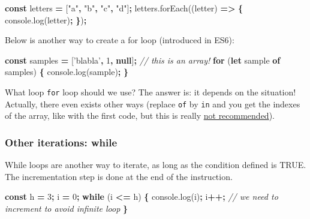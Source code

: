 \documentclass[
]{book}
\newenvironment{Shaded}{\begin{snugshade}}{\end{snugshade}}
\newcommand{\AttributeTok}[1]{\textcolor[rgb]{0.77,0.63,0.00}{#1}}
\newcommand{\CommentTok}[1]{\textcolor[rgb]{0.56,0.35,0.01}{\textit{#1}}}
\newcommand{\ControlFlowTok}[1]{\textcolor[rgb]{0.13,0.29,0.53}{\textbf{#1}}}
\newcommand{\DecValTok}[1]{\textcolor[rgb]{0.00,0.00,0.81}{#1}}
\newcommand{\KeywordTok}[1]{\textcolor[rgb]{0.13,0.29,0.53}{\textbf{#1}}}
\newcommand{\NormalTok}[1]{#1}
\newcommand{\OperatorTok}[1]{\textcolor[rgb]{0.81,0.36,0.00}{\textbf{#1}}}
\newcommand{\StringTok}[1]{\textcolor[rgb]{0.31,0.60,0.02}{#1}}
\newcommand{\VariableTok}[1]{\textcolor[rgb]{0.00,0.00,0.00}{#1}}
\begin{document}
\begin{Shaded}
\begin{Highlighting}[]
\KeywordTok{const}\NormalTok{ letters }\OperatorTok{=}\NormalTok{ [}\StringTok{"a"}\OperatorTok{,} \StringTok{"b"}\OperatorTok{,} \StringTok{"c"}\OperatorTok{,} \StringTok{"d"}\NormalTok{]}\OperatorTok{;}
\VariableTok{letters}\NormalTok{.}\AttributeTok{forEach}\NormalTok{((letter) }\KeywordTok{=>} \OperatorTok{\{}
  \VariableTok{console}\NormalTok{.}\AttributeTok{log}\NormalTok{(letter)}\OperatorTok{;}
\OperatorTok{\}}\NormalTok{)}\OperatorTok{;}
\end{Highlighting}
\end{Shaded}

Below is another way to create a for loop (introduced in ES6):

\begin{Shaded}
\begin{Highlighting}[]
\KeywordTok{const}\NormalTok{ samples }\OperatorTok{=}\NormalTok{ [}\StringTok{'blabla'}\OperatorTok{,} \DecValTok{1}\OperatorTok{,} \KeywordTok{null}\NormalTok{]}\OperatorTok{;} \CommentTok{// this is an array!}
\ControlFlowTok{for}\NormalTok{ (}\KeywordTok{let}\NormalTok{ sample }\KeywordTok{of}\NormalTok{ samples) }\OperatorTok{\{}
 \VariableTok{console}\NormalTok{.}\AttributeTok{log}\NormalTok{(sample)}\OperatorTok{;}
\OperatorTok{\}}
\end{Highlighting}
\end{Shaded}

What loop \texttt{for} loop should we use? The answer is: it depends on the situation! Actually, there even exists other ways (replace \texttt{of} by \texttt{in} and you get the indexes of the array, like with the first code, but this is really \href{https://hacks.mozilla.org/2015/04/es6-in-depth-iterators-and-the-for-of-loop/}{not recommended}).

\hypertarget{other-iterations-while}{%
\subsubsection{Other iterations: while}\label{other-iterations-while}}

While loops are another way to iterate, as long as the condition defined is TRUE. The incrementation step is done at the end of the instruction.

\begin{Shaded}
\begin{Highlighting}[]
\KeywordTok{const}\NormalTok{ h }\OperatorTok{=} \DecValTok{3}\OperatorTok{;}\NormalTok{ i }\OperatorTok{=} \DecValTok{0}\OperatorTok{;}
\ControlFlowTok{while}\NormalTok{ (i }\OperatorTok{<=}\NormalTok{ h) }\OperatorTok{\{}
  \VariableTok{console}\NormalTok{.}\AttributeTok{log}\NormalTok{(i)}\OperatorTok{;}
\NormalTok{  i}\OperatorTok{++;} \CommentTok{// we need to increment to avoid infinite loop}
\OperatorTok{\}}
\end{Highlighting}
\end{Shaded}
\end{document}
